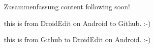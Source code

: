 \Large{Zusammenfassung} 
\newline
content following soon!

this is from DroidEdit on Android to Github. :-)

this is from Github to DroidEdit on Android. :-)
